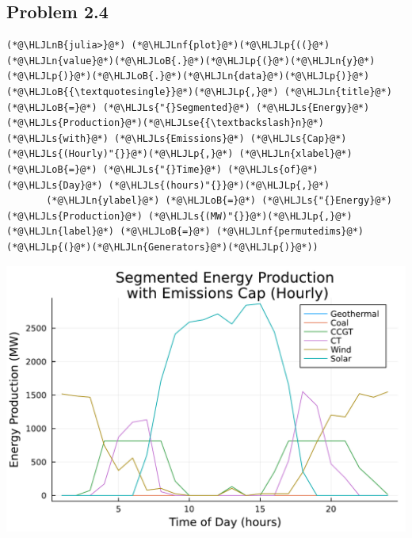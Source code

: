 \documentclass[12pt,a4paper]{article}
\newcommand{\HLJLn}[1]{#1}
\newcommand{\HLJLnf}[1]{\textcolor[RGB]{66,102,213}{#1}}
\newcommand{\HLJLs}[1]{\textcolor[RGB]{201,61,57}{#1}}
\newcommand{\HLJLse}[1]{\textcolor[RGB]{59,151,46}{#1}}
\newcommand{\HLJLnB}[1]{\textcolor[RGB]{59,151,46}{#1}}
\newcommand{\HLJLoB}[1]{\textcolor[RGB]{102,102,102}{\textbf{#1}}}
\newcommand{\HLJLp}[1]{#1}
\begin{document}
\subsection{Problem 2.4}

\begin{lstlisting}
(*@\HLJLnB{julia>}@*) (*@\HLJLnf{plot}@*)(*@\HLJLp{((}@*)(*@\HLJLn{value}@*)(*@\HLJLoB{.}@*)(*@\HLJLp{(}@*)(*@\HLJLn{y}@*)(*@\HLJLp{)}@*)(*@\HLJLoB{.}@*)(*@\HLJLn{data}@*)(*@\HLJLp{)}@*)(*@\HLJLoB{{\textquotesingle}}@*)(*@\HLJLp{,}@*) (*@\HLJLn{title}@*) (*@\HLJLoB{=}@*) (*@\HLJLs{"{}Segmented}@*) (*@\HLJLs{Energy}@*) (*@\HLJLs{Production}@*)(*@\HLJLse{{\textbackslash}n}@*) (*@\HLJLs{with}@*) (*@\HLJLs{Emissions}@*) (*@\HLJLs{Cap}@*) (*@\HLJLs{(Hourly)"{}}@*)(*@\HLJLp{,}@*) (*@\HLJLn{xlabel}@*) (*@\HLJLoB{=}@*) (*@\HLJLs{"{}Time}@*) (*@\HLJLs{of}@*) (*@\HLJLs{Day}@*) (*@\HLJLs{(hours)"{}}@*)(*@\HLJLp{,}@*)
       (*@\HLJLn{ylabel}@*) (*@\HLJLoB{=}@*) (*@\HLJLs{"{}Energy}@*) (*@\HLJLs{Production}@*) (*@\HLJLs{(MW)"{}}@*)(*@\HLJLp{,}@*) (*@\HLJLn{label}@*) (*@\HLJLoB{=}@*) (*@\HLJLnf{permutedims}@*)(*@\HLJLp{(}@*)(*@\HLJLn{Generators}@*)(*@\HLJLp{)}@*))
\end{lstlisting}
\includegraphics[width=\linewidth]{figures/solution-template_9_1.pdf}
\end{document}
